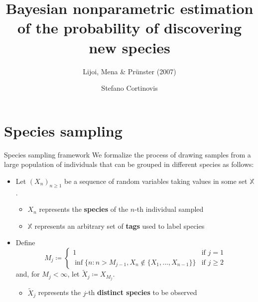\documentclass[11pt, handout]{beamer}
\title[Lijoi et al. (2007)]{Bayesian nonparametric estimation of the probability of discovering new species}
\subtitle{Lijoi, Mena \& Pr{\"u}nster (2007)}
\author{Stefano Cortinovis}
\date[20605 - Machine Learning II]{\displaydate{date}}
\begin{document}
\nocite{*}

\begin{frame}
\titlepage
\end{frame}

\section{Species sampling}

\begin{frame}[t]{Species sampling framework}
We formalize the process of drawing samples from a large population of individuals that can be grouped in different species as follows:
\begin{itemize}
    \item Let \((X_n)_{n \geq 1}\) be a sequence of random variables taking values in some set \(\mathbb{X}\).
    \begin{itemize}
        \item \(X_n\) represents the \textbf{species} of the \(n\)-th individual sampled
        \item \(\mathbb{X}\) represents an arbitrary set of \textbf{tags} used to label species
    \end{itemize}
    \item Define
    \begin{equation*}
        M_j \coloneqq 
        \begin{cases}
            1 & \text{if } j = 1\\
            \inf\{n \colon n > M_{j-1}, X_n \notin \{X_1,...,X_{n-1}\}\} & \text{if } j \geq 2
        \end{cases}
    \end{equation*}
    and, for \(M_j < \infty\), let \(\tilde{X}_j \coloneqq X_{M_j}\).
    \begin{itemize}
        \item \(\tilde{X}_j\) represents the \(j\)-th \textbf{distinct species} to be observed
    \end{itemize}
\end{itemize}
\end{frame}
\end{document}
